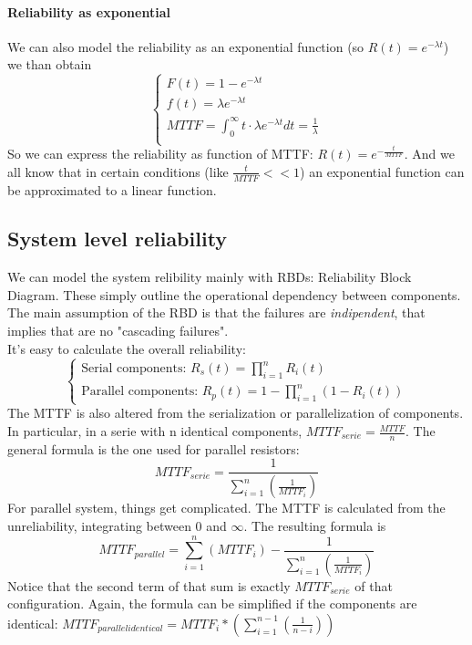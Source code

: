 \documentclass[10pt,a4paper]{article}
\begin{document}
				\paragraph{Reliability as exponential}
					We can also model the reliability as an exponential function (so $R(t) = e^{-\lambda t}$) we than obtain
					\begin{equation}
						\begin{cases}
							F(t) = 1 - e^{-\lambda t} \\
							f(t) = \lambda e^{-\lambda t} \\
							MTTF = \int_{0}^{\infty} t\cdot \lambda e^{-\lambda t} dt = \frac{1}{\lambda}\\
						\end{cases}
					\end{equation}
					So we can express the reliability as function of MTTF: $R(t) = e^{-\frac{t}{MTTF}}$. And we all know that in certain conditions (like $\frac{t}{MTTF} << 1$) an exponential function can be approximated to a linear function.

			\subsection{System level reliability}
				We can model the system relibility mainly with RBDs: Reliability Block Diagram. These simply outline the operational dependency between components. The main assumption of the RBD is that the failures are \emph{indipendent}, that implies that are no "cascading failures".\\
				It's easy to calculate the overall reliability:
				\begin{equation}
					\begin{cases}
						\text{Serial components: } R_s(t) = \prod_{i=1}^{n}R_i(t)\\
						\text{Parallel components: } R_p(t) = 1 - \prod_{i=1}^{n} (1-R_i(t))
					\end{cases}
				\end{equation}
				The MTTF is also altered from the serialization or parallelization of components. In particular, in a serie with n identical components, $MTTF_{serie} = \frac{MTTF}{n}$. The general formula is the one used for parallel resistors:
				\begin{equation}
					MTTF_{serie} = \frac{1}{\sum_{i=1}^{n}(\frac{1}{MTTF_i})}
				\end{equation}
				For parallel system, things get complicated. The MTTF is calculated from the unreliability, integrating between 0 and $\infty$. The resulting formula is
				\begin{equation}
					MTTF_{parallel} = \sum_{i=1}^{n}(MTTF_i) - \frac{1}{\sum_{i=1}^{n}(\frac{1}{MTTF_i})}
				\end{equation}
				Notice that the second term of that sum is exactly $MTTF_{serie}$ of that configuration. Again, the formula can be simplified if the components are identical: $MTTF_{parallel identical} = MTTF_i*(\sum_{i=1}^{n-1}(\frac{1}{n-i}))$\\
				
\end{document}
